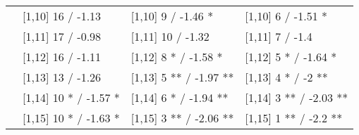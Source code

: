 \begin{table}
\begin{tabular}[t]{llll}
 & {}[1,10] 16  / -1.13 & {}[1,10] 9  / -1.46 * & {}[1,10] 6  / -1.51 *\\
 & {}[1,11] 17  / -0.98 & {}[1,11] 10  / -1.32 & {}[1,11] 7  / -1.4\\
 & {}[1,12] 16  / -1.11 & {}[1,12] 8 * / -1.58 * & {}[1,12] 5 * / -1.64 *\\
\addlinespace
 & {}[1,13] 13  / -1.26 & {}[1,13] 5 ** / -1.97 ** & {}[1,13] 4 * / -2 **\\
 & {}[1,14] 10 * / -1.57 * & {}[1,14] 6 * / -1.94 ** & {}[1,14] 3 ** / -2.03 **\\
 & {}[1,15] 10 * / -1.63 * & {}[1,15] 3 ** / -2.06 ** & {}[1,15] 1 ** / -2.2 **\\
\bottomrule
\end{tabular}
\end{table}
